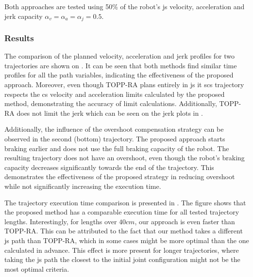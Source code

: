 Both approaches are tested using 50\% of the robot's \gls{js} velocity, acceleration and jerk capacity $\alpha_v\!=\!\alpha_a\!=\!\alpha_j = 0.5$. 



\subsubsection*{Results} The comparison of the planned velocity, acceleration and jerk profiles for two trajectories are shown on . It can be seen that both methods find similar time profiles for all the path variables, indicating the effectiveness of the proposed approach. Moreover, even though TOPP-RA plans entirely in \gls{js} it s\gls{cs} trajectory respects the \gls{cs} velocity and acceleration limits calculated by the proposed method, demonstrating the accuracy of limit calculations. Additionally, TOPP-RA does not limit the jerk which can be seen on the jerk plots in .

Additionally, the influence of the overshoot compensation strategy can be observed in the second (bottom) trajectory. The proposed approach starts braking earlier and does not use the full braking capacity of the robot. The resulting trajectory does not have an overshoot, even though the robot's braking capacity decreases significantly towards the end of the trajectory. This demonstrates the effectiveness of the proposed strategy in reducing overshoot while not significantly increasing the execution time.

The trajectory execution time comparison is presented in . The figure shows that the proposed method has a comparable execution time for all tested trajectory lengths. Interestingly, for lengths over $40cm$, our approach is even faster than TOPP-RA. This can be attributed to the fact that our method takes a different \gls{js} path than TOPP-RA, which in some cases might be more optimal than the one calculated in advance. 
This effect is more present for longer trajectories, where taking the \gls{js} path the closest to the initial joint configuration might not be the most optimal criteria. 


